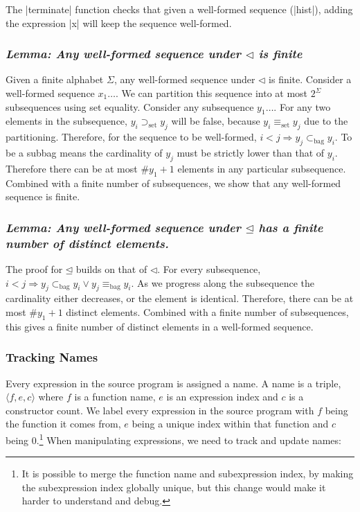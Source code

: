 \documentclass[draft]{sigplanconf}
\newcommand{\name}[3]{\ensuremath{\langle\mathsf{#1},\mathsf{#2},\mathsf{#3}\rangle}}
\newcommand{\lemma}[1]{\subsubsection*{\textit{Lemma: #1}}}
\newcommand{\setsup}{\supset_{\mathrm{set}}}
\newcommand{\setequiv}{\equiv_{\mathrm{set}}}
\newcommand{\bagsub}{\subset_{\mathrm{bag}}}
\newcommand{\bagequiv}{\equiv_{\mathrm{bag}}}
\begin{document}
The |terminate| function checks that given a well-formed sequence (|hist|), adding the expression |x| will keep the sequence well-formed.

\lemma{Any well-formed sequence under $\lhd$ is finite}

Given a finite alphabet $\Sigma$, any well-formed sequence under $\lhd$ is finite. Consider a well-formed sequence $x_1\ldots$. We can partition this sequence into at most $2^\Sigma$ subsequences using set equality. Consider any subsequence $y_1\ldots$. For any two elements in the subsequence, $y_i \setsup y_j$ will be false, because $y_i \setequiv y_j$ due to the partitioning. Therefore, for the sequence to be well-formed, $i < j \Rightarrow y_j \bagsub y_i$. To be a subbag means the cardinality of $y_j$ must be strictly lower than that of $y_i$. Therefore there can be at most $\#y_1+1$ elements in any particular subsequence. Combined with a finite number of subsequences, we show that any well-formed sequence is finite.

\lemma{Any well-formed sequence under $\unlhd$ has a finite number of distinct elements.}

The proof for $\unlhd$ builds on that of $\lhd$. For every subsequence, $i < j \Rightarrow y_j \bagsub y_i \vee y_j \bagequiv y_i$. As we progress along the subsequence the cardinality either decreases, or the element is identical. Therefore, there can be at most $\#y_1+1$ distinct elements. Combined with a finite number of subsequences, this gives a finite number of distinct elements in a well-formed sequence.

\subsubsection{Tracking Names}

Every expression in the source program is assigned a name. A name is a triple, \name{\mathit{f}}{\mathit{e}}{\mathit{c}} where $f$ is a function name, $e$ is an expression index and $c$ is a constructor count. We label every expression in the source program with $f$ being the function it comes from, $e$ being a unique index within that function and $c$ being $0$.\footnote{It is possible to merge the function name and subexpression index, by making the subexpression index globally unique, but this change would make it harder to understand and debug.} When manipulating expressions, we need to track and update names:
\end{document}
